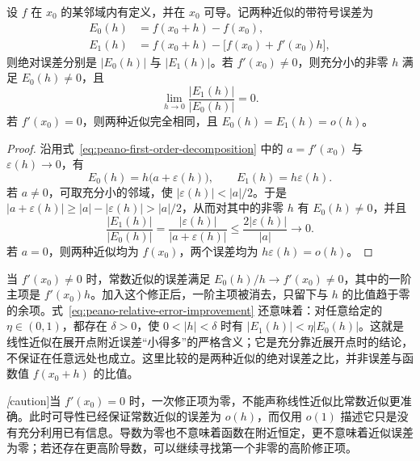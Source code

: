 \begin{proposition}[常数近似与线性近似的误差比较]
\label{prop:peano-constant-linear-error-comparison}
设 $f$ 在 $x_0$ 的某邻域内有定义，并在 $x_0$ 可导。记两种近似的带符号误差为
\begin{equation}
    \begin{aligned}
        E_0(h)&=f(x_0+h)-f(x_0),\\
        E_1(h)&=f(x_0+h)-\bigl[f(x_0)+f'(x_0)h\bigr],
    \end{aligned}
    \label{eq:peano-constant-linear-errors}
\end{equation}
则绝对误差分别是 $|E_0(h)|$ 与 $|E_1(h)|$。若 $f'(x_0)\ne0$，则充分小的非零 $h$ 满足 $E_0(h)\ne0$，且
\begin{equation}
    \lim_{h\to0}\frac{|E_1(h)|}{|E_0(h)|}=0.
    \label{eq:peano-relative-error-improvement}
\end{equation}
若 $f'(x_0)=0$，则两种近似完全相同，且 $E_0(h)=E_1(h)=o(h)$。
\end{proposition}

\begin{proof}
沿用式~\eqref{eq:peano-first-order-decomposition} 中的 $a=f'(x_0)$ 与 $\varepsilon(h)\to0$，有
\[
    E_0(h)=h\bigl(a+\varepsilon(h)\bigr),\qquad
    E_1(h)=h\varepsilon(h).
\]
若 $a\ne0$，可取充分小的邻域，使 $|\varepsilon(h)|<|a|/2$。于是 $|a+\varepsilon(h)|\geq|a|-|\varepsilon(h)|>|a|/2$，从而对其中的非零 $h$ 有 $E_0(h)\ne0$，并且
\[
    \frac{|E_1(h)|}{|E_0(h)|}
    =\frac{|\varepsilon(h)|}{|a+\varepsilon(h)|}
    \leq\frac{2|\varepsilon(h)|}{|a|}\longrightarrow0.
\]
若 $a=0$，则两种近似均为 $f(x_0)$，两个误差均为 $h\varepsilon(h)=o(h)$。
\end{proof}

当 $f'(x_0)\ne0$ 时，常数近似的误差满足 $E_0(h)/h\to f'(x_0)\ne0$，其中的一阶主项是 $f'(x_0)h$。加入这个修正后，一阶主项被消去，只留下与 $h$ 的比值趋于零的余项。式~\eqref{eq:peano-relative-error-improvement} 还意味着：对任意给定的 $\eta\in(0,1)$，都存在 $\delta>0$，使 $0<|h|<\delta$ 时有 $|E_1(h)|<\eta|E_0(h)|$。这就是线性近似在展开点附近误差“小得多”的严格含义；它是充分靠近展开点时的结论，不保证在任意远处也成立。这里比较的是两种近似的绝对误差之比，并非误差与函数值 $f(x_0+h)$ 的比值。

\emph[caution]{当 $f'(x_0)=0$ 时，一次修正项为零，不能声称线性近似比常数近似更准确。}此时可导性已经保证常数近似的误差为 $o(h)$，而仅用 $o(1)$ 描述它只是没有充分利用已有信息。导数为零也不意味着函数在附近恒定，更不意味着近似误差为零；若还存在更高阶导数，可以继续寻找第一个非零的高阶修正项。

